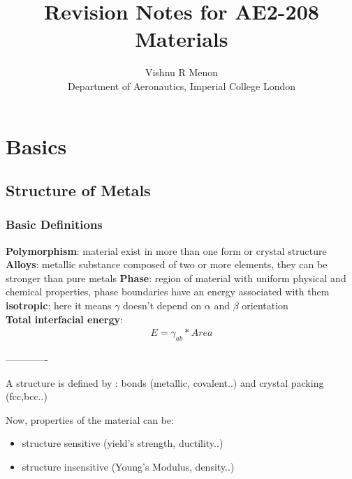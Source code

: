 \documentclass{summary_notes}
\begin{document}
\title{\bf Revision Notes for AE2-208 Materials}
\author{Vishnu R Menon\\ 
\small{Department of Aeronautics, Imperial College London}}
\maketitle
\tableofcontents
\newpage



\chapter{Basics}
\section{Structure of Metals}
\subsection{Basic Definitions}

\textbf{Polymorphism}: material exist in more than one form or crystal structure
\textbf{Alloys}: metallic substance composed of two or more elements, they can be stronger than pure metals 
\textbf{Phase}: region of material with uniform physical and chemical properties, phase boundaries have an energy associated with them\\
\textbf{isotropic}: here it means $\gamma$ doesn't depend on $\alpha$ and $\beta$ orientation\\


\textbf{Total interfacial energy}: 
\begin{align}
    E= \gamma_{ab}*Area 
    \end{align}

\vspace{0.25cm}
-------------
\vspace{0.25cm}

A structure is defined by : bonds (metallic, covalent..) and crystal packing (fcc,bcc..)

Now, properties of the material can be:
\begin{itemize}
\item structure sensitive (yield's strength, ductility..)
\item structure insensitive (Young's Modulus, density..)
\end{itemize}
\end{document}
